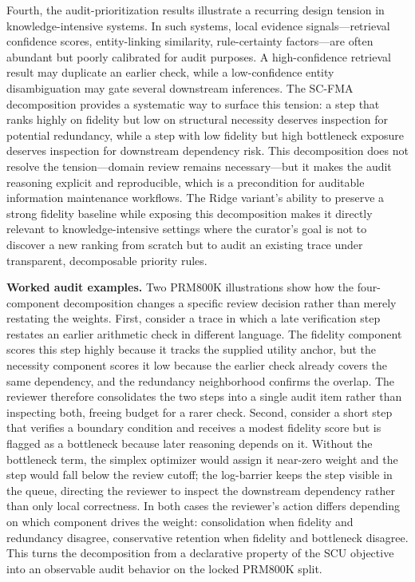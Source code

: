 \documentclass[a4paper,fleqn]{cas-sc}
\begin{document}
Fourth, the audit-prioritization results illustrate a recurring design tension in knowledge-intensive systems. In such systems, local evidence signals---retrieval confidence scores, entity-linking similarity, rule-certainty factors---are often abundant but poorly calibrated for audit purposes. A high-confidence retrieval result may duplicate an earlier check, while a low-confidence entity disambiguation may gate several downstream inferences. The SC-FMA decomposition provides a systematic way to surface this tension: a step that ranks highly on fidelity but low on structural necessity deserves inspection for potential redundancy, while a step with low fidelity but high bottleneck exposure deserves inspection for downstream dependency risk. This decomposition does not resolve the tension---domain review remains necessary---but it makes the audit reasoning explicit and reproducible, which is a precondition for auditable information maintenance workflows. The Ridge variant's ability to preserve a strong fidelity baseline while exposing this decomposition makes it directly relevant to knowledge-intensive settings where the curator's goal is not to discover a new ranking from scratch but to audit an existing trace under transparent, decomposable priority rules.

\medskip
\noindent\textbf{Worked audit examples.} Two PRM800K illustrations show how the four-component decomposition changes a specific review decision rather than merely restating the weights. First, consider a trace in which a late verification step restates an earlier arithmetic check in different language. The fidelity component scores this step highly because it tracks the supplied utility anchor, but the necessity component scores it low because the earlier check already covers the same dependency, and the redundancy neighborhood confirms the overlap. The reviewer therefore consolidates the two steps into a single audit item rather than inspecting both, freeing budget for a rarer check. Second, consider a short step that verifies a boundary condition and receives a modest fidelity score but is flagged as a bottleneck because later reasoning depends on it. Without the bottleneck term, the simplex optimizer would assign it near-zero weight and the step would fall below the review cutoff; the log-barrier keeps the step visible in the queue, directing the reviewer to inspect the downstream dependency rather than only local correctness. In both cases the reviewer's action differs depending on which component drives the weight: consolidation when fidelity and redundancy disagree, conservative retention when fidelity and bottleneck disagree. This turns the decomposition from a declarative property of the SCU objective into an observable audit behavior on the locked PRM800K split.
\end{document}

